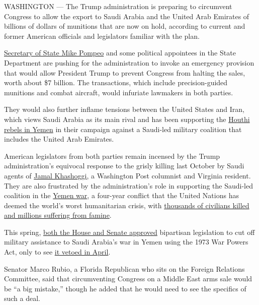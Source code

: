 WASHINGTON --- The Trump administration is preparing to circumvent
Congress to allow the export to Saudi Arabia and the United Arab
Emirates of billions of dollars of munitions that are now on hold,
according to current and former American officials and legislators
familiar with the plan.

\href{https://www.nytimes.com/2019/02/24/us/politics/secretary-of-state-mike-pompeo.html}{Secretary
of State Mike Pompeo} and some political appointees in the State
Department are pushing for the administration to invoke an emergency
provision that would allow President Trump to prevent Congress from
halting the sales, worth about \$7 billion. The transactions, which
include precision-guided munitions and combat aircraft, would infuriate
lawmakers in both parties.

They would also further inflame tensions between the United States and
Iran, which views Saudi Arabia as its main rival and has been supporting
the
\href{https://www.nytimes.com/interactive/2018/10/31/magazine/yemen-war-saudi-arabia.html}{Houthi
rebels in Yemen} in their campaign against a Saudi-led military
coalition that includes the United Arab Emirates.

American legislators from both parties remain incensed by the Trump
administration's equivocal response to the grisly killing last October
by Saudi agents of
\href{https://www.nytimes.com/2018/10/16/world/middleeast/khashoggi-saudi-prince.html}{Jamal
Khashoggi}, a Washington Post columnist and Virginia resident. They are
also frustrated by the administration's role in supporting the Saudi-led
coalition in the
\href{https://www.nytimes.com/interactive/2018/10/26/world/middleeast/saudi-arabia-war-yemen.html}{Yemen
war}, a four-year conflict that the United Nations has deemed the
world's worst humanitarian crisis, with
\href{https://www.nytimes.com/interactive/2018/10/20/world/middleeast/saudi-arabia-invisible-war-yemen.html?module=inline}{thousands
of civilians killed and millions suffering from famine}.

This spring,
\href{https://www.nytimes.com/2019/04/04/us/politics/yemen-war-end-vote.html}{both
the House and Senate approved} bipartisan legislation to cut off
military assistance to Saudi Arabia's war in Yemen using the 1973 War
Powers Act, only to see
\href{https://www.nytimes.com/2019/04/16/us/politics/trump-veto-yemen.html}{it
vetoed in April}.

Senator Marco Rubio, a Florida Republican who sits on the Foreign
Relations Committee, said that circumventing Congress on a Middle East
arms sale would be ``a big mistake,'' though he added that he would need
to see the specifics of such a deal.

